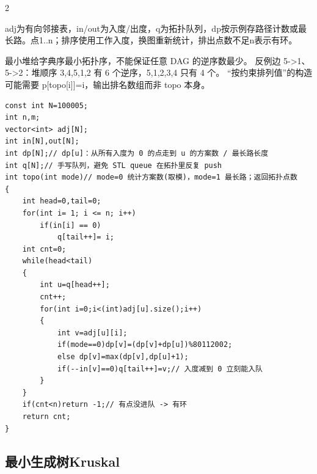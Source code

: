 \documentclass[UTF8,fontset=fandol,a4paper,twoside]{ctexart}
\newcommand{\note}[1]{{\fontsize{10}{12}\selectfont #1\par}}
\begin{document}
\begin{multicols}{2}
\note{adj为有向邻接表，in/\allowbreak{}out为入度/\allowbreak{}出度，q为拓扑队列，dp按示例存路径计数或最长路。点1.\allowbreak{}.\allowbreak{}n；排序使用工作入度，换图重新统计，排出点数不足n表示有环。}
\note{最小堆给字典序最小拓扑序，不能保证任意 DAG 的逆序数最少。 反例边 5-\allowbreak{}>\allowbreak{}1、5-\allowbreak{}>\allowbreak{}2：堆顺序 3,\allowbreak{}4,\allowbreak{}5,\allowbreak{}1,\allowbreak{}2 有 6 个逆序，5,\allowbreak{}1,\allowbreak{}2,\allowbreak{}3,\allowbreak{}4 只有 4 个。 “按约束排列值”的构造可能需要 p[\allowbreak{}topo[\allowbreak{}i]\allowbreak{}]\allowbreak{}=\allowbreak{}i，输出排名数组而非 topo 本身。}
\begin{lstlisting}
const int N=100005;
int n,m;
vector<int> adj[N];
int in[N],out[N];
int dp[N];// dp[u]：从所有入度为 0 的点走到 u 的方案数 / 最长路长度
int q[N];// 手写队列，避免 STL queue 在拓扑里反复 push
int topo(int mode)// mode=0 统计方案数(取模)，mode=1 最长路；返回拓扑点数
{
    int head=0,tail=0;
    for(int i= 1; i <= n; i++)
        if(in[i] == 0)
            q[tail++]= i;
    int cnt=0;
    while(head<tail)
    {
        int u=q[head++];
        cnt++;
        for(int i=0;i<(int)adj[u].size();i++)
        {
            int v=adj[u][i];
            if(mode==0)dp[v]=(dp[v]+dp[u])%80112002;
            else dp[v]=max(dp[v],dp[u]+1);
            if(--in[v]==0)q[tail++]=v;// 入度减到 0 立刻能入队
        }
    }
    if(cnt<n)return -1;// 有点没进队 -> 有环
    return cnt;
}
\end{lstlisting}
\subsection{最小生成树Kruskal}


\end{multicols}
\end{document}
